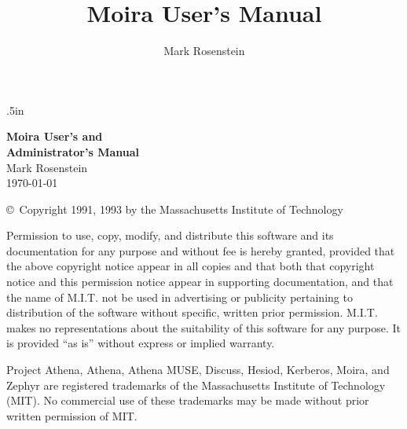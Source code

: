 \makeindex
{}
\marginparwidth 0pt
\oddsidemargin  .5in
\evensidemargin  0pt
\marginparsep 0pt
\topmargin   0pt
\textwidth   6in
\textheight  8in
\pagestyle{fancy}

\newcommand{\athena}{\PSbox{/usr/athena/lib/owl.PS hscale=0.1 vscale=0.1}{7pt}{7pt}}
\title{Moira User's Manual}
\author{Mark Rosenstein}

\begin{titlepage}
\vspace{1 in}
 \hfill
{}

\vspace*{2.5in}
\hfill {\Huge \bf Moira User's and\\[.25in]
\hspace*{\fill} Administrator's Manual}\\

\vspace*{2in}
{\LARGE \hfill Mark Rosenstein\\[.25in] 
\hspace*{\fill} \today\\}
\end{titlepage}
\cfoot{}
\setlength{\headrulewidth}{0pt}
\setcounter{page}{2}
\renewcommand{\thepage}{\roman{page}}

\vspace*{3in}
\copyright\ Copyright 1991, 1993 by the Massachusetts Institute of Technology

Permission to use, copy, modify, and distribute this
software and its documentation for any purpose and without
fee is hereby granted, provided that the above copyright
notice appear in all copies and that both that copyright
notice and this permission notice appear in supporting
documentation, and that the name of M.I.T. not be used in
advertising or publicity pertaining to distribution of the
software without specific, written prior permission.
M.I.T. makes no representations about the suitability of
this software for any purpose.  It is provided ``as is''
without express or implied warranty.

Project Athena, Athena, Athena MUSE, Discuss, Hesiod, Kerberos, Moira,
and Zephyr are registered trademarks of the Massachusetts Institute of
Technology (MIT).  No commercial use of these trademarks may be made
without prior written permission of MIT.

